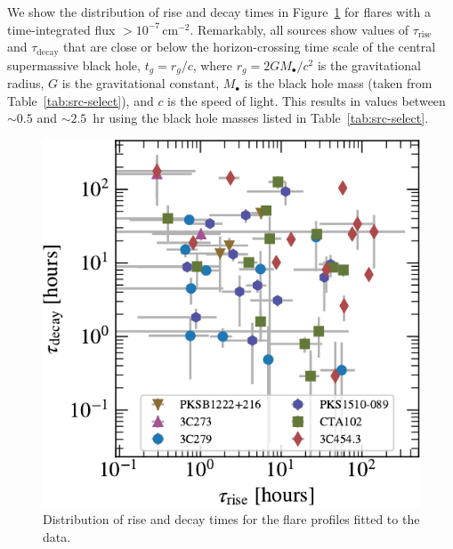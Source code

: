 \documentclass[twocolumn]{aastex62}
\begin{document}
We show the distribution of rise and decay times in  Figure~\ref{fig:times-hist} for flares with a time-integrated flux $>10^{-7}\,\mathrm{cm}^{-2}$. 
Remarkably, all sources show values of $\tau_\mathrm{rise}$ and $\tau_\mathrm{decay}$ that are close or below the horizon-crossing time scale of the central supermassive black hole,
$t_g = r_g / c$, where $r_g = 2 G M_\bullet / c^2 $ is the gravitational radius, $G$ is the gravitational constant, $M_\bullet$ is the black hole mass (taken from Table~\ref{tab:src-select}), and $c$ is the speed of light.
This results in values between $\sim0.5$ and $\sim2.5$~hr using the black hole masses listed in Table~\ref{tab:src-select}.

\begin{figure}
    \centering
    \includegraphics[width = .9\linewidth]{lcfithop_results_trise_vs_tdecay_orbit_maxiter2_fsys0p00_addcomp0.pdf}
    \caption{
    Distribution of rise and decay times for the flare profiles fitted to the data. 
    }
    \label{fig:times-hist}
\end{figure}
\end{document}
